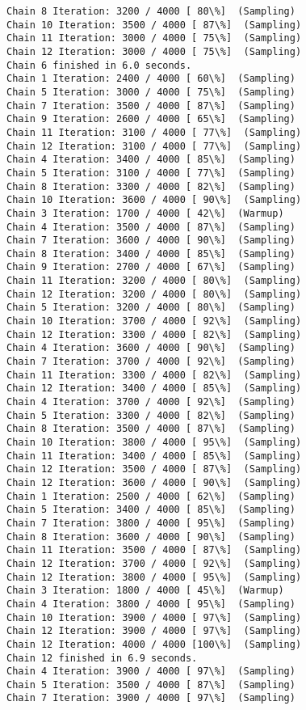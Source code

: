 \documentclass[11pt]{article}
\begin{document}
\begin{Verbatim}[commandchars=\\\{\}]
Chain 8 Iteration: 3200 / 4000 [ 80\%]  (Sampling)
Chain 10 Iteration: 3500 / 4000 [ 87\%]  (Sampling)
Chain 11 Iteration: 3000 / 4000 [ 75\%]  (Sampling)
Chain 12 Iteration: 3000 / 4000 [ 75\%]  (Sampling)
Chain 6 finished in 6.0 seconds.
Chain 1 Iteration: 2400 / 4000 [ 60\%]  (Sampling)
Chain 5 Iteration: 3000 / 4000 [ 75\%]  (Sampling)
Chain 7 Iteration: 3500 / 4000 [ 87\%]  (Sampling)
Chain 9 Iteration: 2600 / 4000 [ 65\%]  (Sampling)
Chain 11 Iteration: 3100 / 4000 [ 77\%]  (Sampling)
Chain 12 Iteration: 3100 / 4000 [ 77\%]  (Sampling)
Chain 4 Iteration: 3400 / 4000 [ 85\%]  (Sampling)
Chain 5 Iteration: 3100 / 4000 [ 77\%]  (Sampling)
Chain 8 Iteration: 3300 / 4000 [ 82\%]  (Sampling)
Chain 10 Iteration: 3600 / 4000 [ 90\%]  (Sampling)
Chain 3 Iteration: 1700 / 4000 [ 42\%]  (Warmup)
Chain 4 Iteration: 3500 / 4000 [ 87\%]  (Sampling)
Chain 7 Iteration: 3600 / 4000 [ 90\%]  (Sampling)
Chain 8 Iteration: 3400 / 4000 [ 85\%]  (Sampling)
Chain 9 Iteration: 2700 / 4000 [ 67\%]  (Sampling)
Chain 11 Iteration: 3200 / 4000 [ 80\%]  (Sampling)
Chain 12 Iteration: 3200 / 4000 [ 80\%]  (Sampling)
Chain 5 Iteration: 3200 / 4000 [ 80\%]  (Sampling)
Chain 10 Iteration: 3700 / 4000 [ 92\%]  (Sampling)
Chain 12 Iteration: 3300 / 4000 [ 82\%]  (Sampling)
Chain 4 Iteration: 3600 / 4000 [ 90\%]  (Sampling)
Chain 7 Iteration: 3700 / 4000 [ 92\%]  (Sampling)
Chain 11 Iteration: 3300 / 4000 [ 82\%]  (Sampling)
Chain 12 Iteration: 3400 / 4000 [ 85\%]  (Sampling)
Chain 4 Iteration: 3700 / 4000 [ 92\%]  (Sampling)
Chain 5 Iteration: 3300 / 4000 [ 82\%]  (Sampling)
Chain 8 Iteration: 3500 / 4000 [ 87\%]  (Sampling)
Chain 10 Iteration: 3800 / 4000 [ 95\%]  (Sampling)
Chain 11 Iteration: 3400 / 4000 [ 85\%]  (Sampling)
Chain 12 Iteration: 3500 / 4000 [ 87\%]  (Sampling)
Chain 12 Iteration: 3600 / 4000 [ 90\%]  (Sampling)
Chain 1 Iteration: 2500 / 4000 [ 62\%]  (Sampling)
Chain 5 Iteration: 3400 / 4000 [ 85\%]  (Sampling)
Chain 7 Iteration: 3800 / 4000 [ 95\%]  (Sampling)
Chain 8 Iteration: 3600 / 4000 [ 90\%]  (Sampling)
Chain 11 Iteration: 3500 / 4000 [ 87\%]  (Sampling)
Chain 12 Iteration: 3700 / 4000 [ 92\%]  (Sampling)
Chain 12 Iteration: 3800 / 4000 [ 95\%]  (Sampling)
Chain 3 Iteration: 1800 / 4000 [ 45\%]  (Warmup)
Chain 4 Iteration: 3800 / 4000 [ 95\%]  (Sampling)
Chain 10 Iteration: 3900 / 4000 [ 97\%]  (Sampling)
Chain 12 Iteration: 3900 / 4000 [ 97\%]  (Sampling)
Chain 12 Iteration: 4000 / 4000 [100\%]  (Sampling)
Chain 12 finished in 6.9 seconds.
Chain 4 Iteration: 3900 / 4000 [ 97\%]  (Sampling)
Chain 5 Iteration: 3500 / 4000 [ 87\%]  (Sampling)
Chain 7 Iteration: 3900 / 4000 [ 97\%]  (Sampling)

\end{Verbatim}
\end{document}
